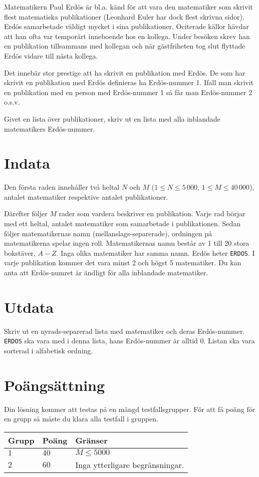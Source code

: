 
Matematikern Paul Erdös är bl.a. känd för att vara den matematiker som skrivit flest matematiska publikationer
(Leonhard Euler har dock flest skrivna sidor). Erdös samarbetade väldigt mycket i sina publikationer. Ociterade
källor hävdar att han ofta var temporärt inneboende hos en kollega. Under besöken skrev han en publikation
tillsammans med kollegan och när gästfriheten tog slut flyttade Erdös vidare till nästa kollega.

Det innebär stor prestige att ha skrivit en publikation med Erdös. De som har skrivit en publikation med Erdös
definieras ha Erdös-nummer 1. Ifall man skrivit en publikation med en person med Erdös-nummer 1 så får man Erdös-nummer 2 o.s.v.

Givet en lista över publikationer, skriv ut en lista med alla inblandade matematikers Erdös-nummer.

\section*{Indata}
Den första raden innehåller två heltal $N$ och $M$ ($1 \le N \le 5\,000$, $1 \le M \le 40\,000$), antalet
matematiker respektive antalet publikationer.

Därefter följer $M$ rader som vardera beskriver en publikation. Varje rad börjar med ett heltal,
antalet matematiker som samarbetade i publikationen. Sedan följer matematikernas namn (mellanslags-separerade),
ordningen på matematikerna spelar ingen roll. Matematikernas namn består av 1 till 20 stora bokstäver, $A - Z$.
Inga olika matematiker har samma namn. Erdös heter \texttt{ERDOS}. I varje publikation kommer det vara minst 2
och högst 5 matematiker. Du kan anta att Erdös-numret är ändligt för alla inblandade matematiker.

\section*{Utdata}
Skriv ut en nyrads-separerad lista med matematiker och deras Erdös-nummer. \texttt{ERDOS} ska vara med i denna
lista, hans Erdös-nummer är alltid 0. Listan ska vara sorterad i alfabetisk ordning. 


\section*{Poängsättning}
Din lösning kommer att testas på en mängd testfallsgrupper.
För att få poäng för en grupp så måste du klara alla testfall i gruppen.

\noindent
\begin{tabular}{| l | l | p{12cm} |}
  \hline
  \textbf{Grupp} & \textbf{Poäng} & \textbf{Gränser} \\ \hline
  $1$    & $40$          & $M \leq 5000$  \\ \hline
  $2$    & $60$          & Inga ytterligare begränsningar.  \\ \hline
\end{tabular}
